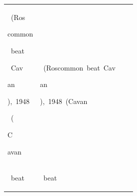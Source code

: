 \begin{table}[h]
\begin{tabular}{ l l l l }
 \colorbox{cm_31!40}{\strut \ (Ros}\colorbox{cm_32!40}{\strut common}\colorbox{cm_36!40}{\strut \ beat}\colorbox{cm_28!40}{\strut \ Cav}\colorbox{cm_32!40}{\strut an}\colorbox{cm_29!40}{\strut ),\ 1948}\colorbox{cm_31!40}{\strut \ (}\colorbox{cm_36!40}{\strut C}\colorbox{cm_29!40}{\strut avan} & \colorbox{cm_0!40}{\strut \ (Roscommon\ beat\ Cav}\colorbox{cm_12!40}{\strut an}\colorbox{cm_0!40}{\strut ),\ 1948\ (Cavan} &  &  \\ 
 \colorbox{cm_33!40}{\strut \ beat} & \colorbox{cm_0!40}{\strut \ beat} &  &  \\ 
 \bottomrule
    \end{tabular}
      \label{tab:data_wikisept21_allireland}
  \end{table}